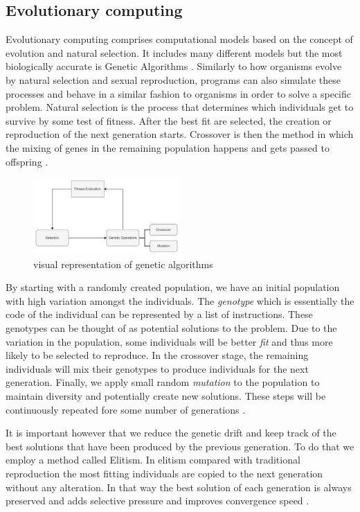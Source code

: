 \subsection{Evolutionary computing}
Evolutionary computing comprises computational models based on the concept of evolution and natural selection. 
It includes many different models but the most biologically accurate is Genetic Algorithms \cite{drugan2019reinforcement}. 
Similarly to how organisms evolve by natural selection and sexual reproduction, programs can also simulate these processes and behave in a similar fashion to organisms in order to solve a specific problem. 
Natural selection is the process that determines which individuals get to survive by some test of fitness. 
After the best fit are selected, the creation or reproduction of the next generation starts. 
Crossover is then the method in which the mixing of genes in the remaining population happens and gets passed to offspring \cite{holland1992genetic}.

\begin{figure}[H]
    \centering
    \includegraphics [width=0.5\textwidth]{Images/GA_graph.png}
    \caption{visual representation of genetic algorithms}
    \label{figGA}
\end{figure}

By starting with a randomly created population, we have an initial population with high variation amongst the individuals. 
The \textit{genotype} which is essentially the code of the individual can be represented by a list of instructions. 
These genotypes can be thought of as potential solutions to the problem. 
Due to the variation in the population, some individuals will be better \textit{fit} and thus more likely to be selected to reproduce. 
In the crossover stage, the remaining individuals will mix their genotypes to produce individuals for the next generation.
Finally, we apply small random \textit{mutation} to the population to maintain diversity and potentially create new solutions.
These steps will be continuously repeated fore some number of generations \cite{forrest1996genetic}. 

It is important however that we reduce the genetic drift and keep track of the best solutions that have been produced by the previous generation. To do that we employ a method called Elitism. In elitism compared with traditional reproduction the most fitting individuals are copied to the next generation without any alteration. In that way the best solution of each generation is always preserved and adds selective pressure and improves convergence speed \cite{du2018elitism}.

